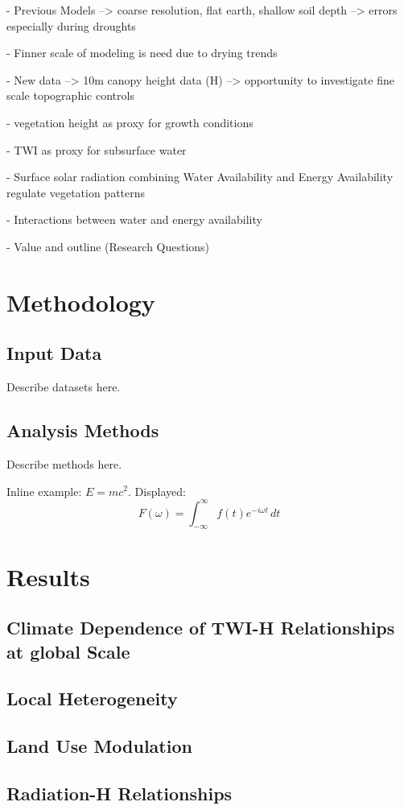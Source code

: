\documentclass[12pt, a4paper]{article}
\begin{document}
- Previous Models --> coarse resolution, flat earth, shallow soil depth --> errors especially during droughts

- Finner scale of modeling is need due to drying trends

- New data --> 10m canopy height data (H) --> opportunity to investigate fine scale topographic controls

- vegetation height as proxy for growth conditions

- TWI as proxy for subsurface water

- Surface solar radiation combining Water Availability and Energy Availability regulate vegetation patterns

- Interactions between water and energy availability

- Value and outline (Research Questions)

\section{Methodology}
\subsection{Input Data}
Describe datasets here.
\subsection{Analysis Methods}
Describe methods here.

Inline example: $E=mc^2$.  
Displayed:
\begin{equation}
F(\omega) = \int_{-\infty}^{\infty} f(t) e^{-i\omega t}\,dt
\end{equation}

\section{Results}
\subsection{Climate Dependence of TWI-H Relationships at global Scale}
\subsection{Local Heterogeneity}
\subsection{Land Use Modulation}
\subsection{Radiation-H Relationships}
\end{document}

